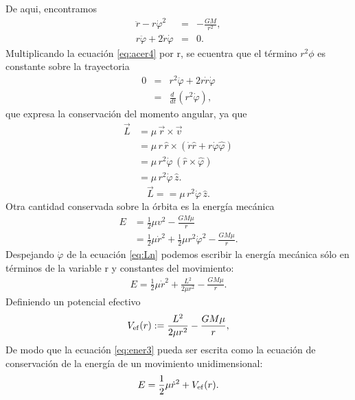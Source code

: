 De aqui, encontramos 
\begin{eqnarray}
    \ddot{r}-r\dot{\varphi}^2&=&-\frac{GM}{r^2},\label{eq:acer3}\\
    r\ddot{\varphi}+2\dot{r}\dot{\varphi}&=&0.\label{eq:acer4}
\end{eqnarray}
Multiplicando la ecuación \ref{eq:acer4} por r, se ecuentra que el término $r^2\phi$ es constante sobre la trayectoria
\begin{eqnarray*}
    0&=&r^2\ddot{\varphi}+2r\dot{r}\dot{\varphi}\\
    &=&\frac{d\ }{dt}\left(r^2\dot{\varphi}\right),
\end{eqnarray*}
que expresa la conservación del momento angular, ya que
\begin{align*}
    \vec{L} & = \mu\,\vec{r}\times\vec{v}\\
    & = \mu\,r\,\hat{r}\times\left(\dot{r}\hat{r}+r\dot{\varphi}\hat{\varphi}
    \right)\\
    & = \mu\,r^2\dot{\varphi}\,(\hat{r}\times\hat{\varphi})\\
    & = \mu\,r^2\dot{\varphi}\,\hat{z}.
    \end{align*}
\begin{equation}
    \vec{L} == \mu\,r^2\dot{\varphi}\,\hat{z}. \label{eq:Ln}
\end{equation}
Otra cantidad conservada sobre la órbita es la energía mecánica
\begin{align}
    E&=\frac{1}{2}\mu v^2-\frac{GM\mu}{r} \label{eq:ener1}\\
    &=\frac{1}{2}\mu\dot{r}^2+\frac{1}{2}\mu r^2\dot{\varphi}^2-\frac{GM\mu}{r}.\label{eq:ener2}
\end{align}
Despejando $\dot{\varphi}$ de la ecuación \ref{eq:Ln} podemos escribir la energía mecánica sólo en términos de la variable r y constantes del movimiento:
\begin{eqnarray}
    E=\frac{1}{2}\mu\dot{r}^2+\frac{L^2}{2\mu r^2}-\frac{GM\mu}{r} .\label{eq:ener3}
\end{eqnarray}
Definiendo un potencial efectivo
\begin{equation}
    V_{\rm ef}(r):=\frac{L^2}{2\mu r^2}-\frac{GM\mu}{r},
\end{equation}
De modo que la ecuación \ref{eq:ener3} pueda ser escrita como la ecuación de conservación de la energía de un movimiento unidimensional:
\begin{equation}
    E=\frac{1}{2}\mu\dot{r}^2+V_{\rm ef}(r) . \label{eq:EVef}
\end{equation}
